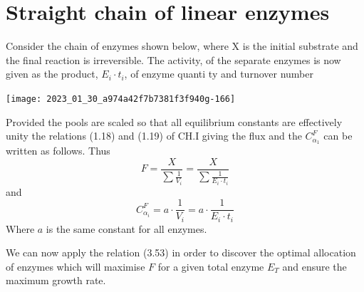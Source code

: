 \section{Straight chain of linear enzymes}

Consider the chain of enzymes shown below, where $\mathrm{X}$ is the initial substrate and the final reaction is irreversible. The activity, of the separate enzymes is now given as the product, $E_{i} \cdot t_{i}$, of enzyme quanti ty and turnover number

\begin{center}
\texttt{[image: 2023\_01\_30\_a974a42f7b7381f3f940g-166]}
\end{center}

Provided the pools are scaled so that all equilibrium constants are effectively unity the relations (1.18) and (1.19) of CH.I giving the flux and the $C_{\alpha_{1}}^{F}$ can be written as follows. Thus
%
\begin{equation}
F=\frac{X}{\sum \frac{1}{V_{i}}} = \frac{X}{\sum \frac{1}{E_i \cdot t_{i}}}
\label{eqn:354}
\end{equation}
%
and
%
\begin{equation}
C_{\alpha_{i}}^{F} = a \cdot \frac{1}{V_{i}} = a \cdot \frac{1}{E_{i} \cdot {t_i}}
\label{eqn:355}
\end{equation}
%
Where $a$ is the same constant for all enzymes.

We can now apply the relation (3.53) in order to discover the optimal allocation of enzymes which will maximise $F$ for a given total enzyme $E_{T}$ and ensure the maximum growth rate.

